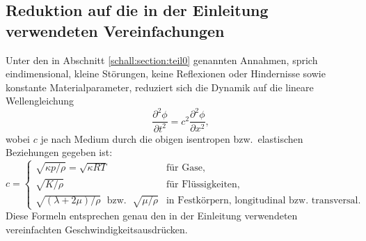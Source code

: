 %
%

\subsection{Reduktion auf die in der Einleitung verwendeten Vereinfachungen}
Unter den in Abschnitt \ref{schall:section:teil0} genannten Annahmen, sprich eindimensional,
kleine Störungen, keine Reflexionen oder Hindernisse sowie konstante
Materialparameter, reduziert sich die Dynamik auf die lineare
Wellengleichung
\[
    \frac{\partial^2 \phi}{\partial t^2}=c^2\frac{\partial^2 \phi}{\partial x^2},
\]
wobei $c$ je nach Medium durch die obigen isentropen bzw.\ elastischen
Beziehungen gegeben ist:
\[
    c=\begin{cases}
    \sqrt{\kappa p/\rho}=\sqrt{\kappa R T}                    & \text{für Gase},\\[1mm]
    \sqrt{K/\rho}                                            & \text{für Flüssigkeiten},\\[1mm]
    \sqrt{(\lambda+2\mu)/\rho}\;\text{ bzw. }\;\!\sqrt{\mu/\rho} & \text{in Festkörpern, longitudinal bzw.~transversal}.
\end{cases}
\]
Diese Formeln entsprechen genau den in der Einleitung verwendeten
vereinfachten Geschwindigkeitsausdrücken.
